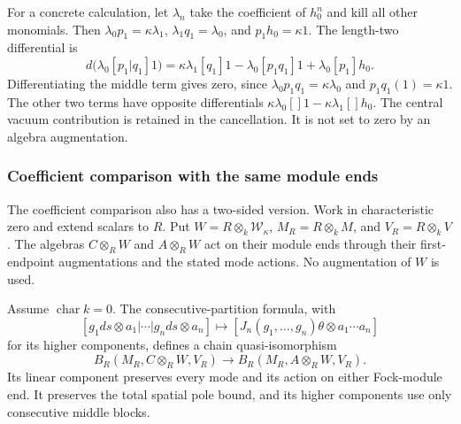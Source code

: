 For a concrete calculation, let \(\lambda_n\) take the coefficient
of \(h_0^n\) and kill all other monomials.  Then
\(\lambda_0p_1=\kappa\lambda_1\),
\(\lambda_1q_1=\lambda_0\), and \(p_1h_0=\kappa1\).
The length-two differential is
\[
 d\bigl(\lambda_0[p_1|q_1]1\bigr)
 =\kappa\lambda_1[q_1]1-\lambda_0[p_1q_1]1
       +\lambda_0[p_1]h_0.
\]
Differentiating the middle term gives zero, since
\(\lambda_0p_1q_1=\kappa\lambda_0\) and
\(p_1q_1(1)=\kappa1\).  The other two terms have opposite
differentials
\(\kappa\lambda_0[]1-\kappa\lambda_1[]h_0\).
The central vacuum contribution is retained in the cancellation.
It is not set to zero by an algebra augmentation.



\subsubsection{Coefficient comparison with the same module ends}

The coefficient comparison also has a two-sided version.
Work in characteristic zero and extend scalars to \(R\).
Put \(W=R\otimes_k\mathscr W_\kappa\),
\(M_R=R\otimes_kM\), and \(V_R=R\otimes_kV\).
The algebras \(C\otimes_R W\) and \(A\otimes_R W\)
act on their module ends through their first-endpoint augmentations
and the stated mode actions.  No augmentation of \(W\) is used.

\begin{theorem}
\label{mb:thm:two-sided-comparison}
Assume \(\operatorname{char}k=0\).  The consecutive-partition formula, with
\[
 [g_1ds\otimes a_1|\cdots|g_nds\otimes a_n]
 \longmapsto
 [J_n(g_1,\ldots,g_n)\theta\otimes a_1\cdots a_n]
\]
for its higher components, defines a chain quasi-isomorphism
\[
 B_R(M_R,C\otimes_R W,V_R)
    \longrightarrow B_R(M_R,A\otimes_R W,V_R).
\]
Its linear component preserves every mode and its action on either
Fock-module end.  It preserves the total spatial pole bound, and its
higher components use only consecutive middle blocks.
\end{theorem}

